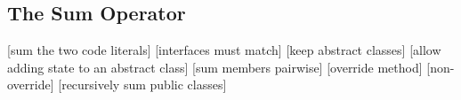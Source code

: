 \subsection{The Sum Operator}
\begin{defs}
[sum the two code literals]
{}[interfaces must match]
[keep abstract classes]
[allow adding state to an abstract class]
{}[sum members pairwise]
[override method]
[non-override]
[recursively sum public classes]
\end{defs}

